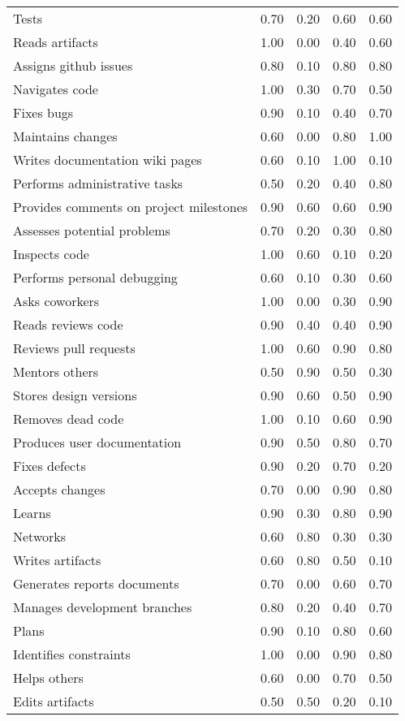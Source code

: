 \begin{tabular}{lrrrr}
Tests & 0.70 & 0.20 & 0.60 & 0.60 \\
Reads artifacts & 1.00 & 0.00 & 0.40 & 0.60 \\
Assigns github issues & 0.80 & 0.10 & 0.80 & 0.80 \\
Navigates code & 1.00 & 0.30 & 0.70 & 0.50 \\
Fixes bugs & 0.90 & 0.10 & 0.40 & 0.70 \\
Maintains changes & 0.60 & 0.00 & 0.80 & 1.00 \\
Writes documentation wiki pages & 0.60 & 0.10 & 1.00 & 0.10 \\
Performs administrative tasks & 0.50 & 0.20 & 0.40 & 0.80 \\
Provides comments on project milestones & 0.90 & 0.60 & 0.60 & 0.90 \\
Assesses potential problems & 0.70 & 0.20 & 0.30 & 0.80 \\
Inspects code & 1.00 & 0.60 & 0.10 & 0.20 \\
Performs personal debugging & 0.60 & 0.10 & 0.30 & 0.60 \\
Asks coworkers & 1.00 & 0.00 & 0.30 & 0.90 \\
Reads reviews code & 0.90 & 0.40 & 0.40 & 0.90 \\
Reviews pull requests & 1.00 & 0.60 & 0.90 & 0.80 \\
Mentors others & 0.50 & 0.90 & 0.50 & 0.30 \\
Stores design versions & 0.90 & 0.60 & 0.50 & 0.90 \\
Removes dead code & 1.00 & 0.10 & 0.60 & 0.90 \\
Produces user documentation & 0.90 & 0.50 & 0.80 & 0.70 \\
Fixes defects & 0.90 & 0.20 & 0.70 & 0.20 \\
Accepts changes & 0.70 & 0.00 & 0.90 & 0.80 \\
Learns & 0.90 & 0.30 & 0.80 & 0.90 \\
Networks & 0.60 & 0.80 & 0.30 & 0.30 \\
Writes artifacts & 0.60 & 0.80 & 0.50 & 0.10 \\
Generates reports documents & 0.70 & 0.00 & 0.60 & 0.70 \\
Manages development branches & 0.80 & 0.20 & 0.40 & 0.70 \\
Plans & 0.90 & 0.10 & 0.80 & 0.60 \\
Identifies constraints & 1.00 & 0.00 & 0.90 & 0.80 \\
Helps others & 0.60 & 0.00 & 0.70 & 0.50 \\
Edits artifacts & 0.50 & 0.50 & 0.20 & 0.10 \\
\bottomrule
\end{tabular}
